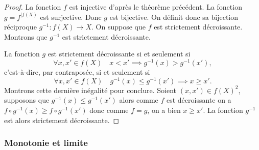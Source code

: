 \begin{proof}
  La fonction \(f\) est injective d'après le théorème précédent. La fonction 
  \(g=f^{|f(X)}\) est surjective. Donc \(g\) est bijective. On définit donc sa 
  bijection réciproque \(g^{-1}:f(X) \longrightarrow X\). On suppose que \(f\) 
  est strictement décroissante. Montrons que \(g^{-1}\) est strictement 
  décroissante.

  La fonction \(g\) est strictement décroissante si et seulement si
  \begin{equation}
    \forall x,x' \in f(X) \quad x < x' \implies g^{-1}(x) > g^{-1}(x') ,
  \end{equation}
  c'est-à-dire, par contraposée, si et seulement si \begin{equation}
    \forall x,x' \in f(X) \quad  g^{-1}(x) \leqslant g^{-1}(x') \implies x 
    \geqslant x'.
  \end{equation}
  Montrons cette dernière inégalité pour conclure. Soient \((x, x') \in 
  f(X)^2\), supposons que \(g^{-1}(x) \leqslant g^{-1}(x')\) alors comme \(f\) 
  est décroissante on a \(f \circ g^{-1}(x) \geqslant f \circ g^{-1}(x')\) donc 
  comme \(f=g\), on a bien \(x \geqslant x'\). La fonction \(g^{-1}\) est alors 
  strictement décroissante.
\end{proof}

\subsubsection{Monotonie et limite}

